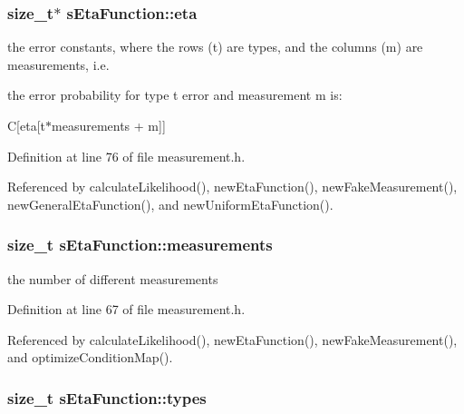 \hypertarget{structsEtaFunction_a7585a59b1861523157055f8c8b0263e3}{
\subsubsection[{eta}]{\setlength{\rightskip}{0pt plus 5cm}size\-\_\-t$\ast$ {\bf s\-Eta\-Function\-::eta}}}\label{structsEtaFunction_a7585a59b1861523157055f8c8b0263e3}


the error constants, where the rows (t) are types, and the columns (m) are measurements, i.\-e. 

the error probability for type t error and measurement m is\-:

\-C\mbox{[}eta\mbox{[}t$\ast$measurements + m\mbox{]}\mbox{]} 

\-Definition at line 76 of file measurement.\-h.



\-Referenced by calculate\-Likelihood(), new\-Eta\-Function(), new\-Fake\-Measurement(), new\-General\-Eta\-Function(), and new\-Uniform\-Eta\-Function().

\hypertarget{structsEtaFunction_aa323ef11935cd1e8d6ef56405ab96cf8}{
\subsubsection[{measurements}]{\setlength{\rightskip}{0pt plus 5cm}size\-\_\-t {\bf s\-Eta\-Function\-::measurements}}}\label{structsEtaFunction_aa323ef11935cd1e8d6ef56405ab96cf8}


the number of different measurements 



\-Definition at line 67 of file measurement.\-h.



\-Referenced by calculate\-Likelihood(), new\-Eta\-Function(), new\-Fake\-Measurement(), and optimize\-Condition\-Map().

\hypertarget{structsEtaFunction_afd94a9856047e0987c5e8667a4838b71}{
\subsubsection[{types}]{\setlength{\rightskip}{0pt plus 5cm}size\-\_\-t {\bf s\-Eta\-Function\-::types}}}\label{structsEtaFunction_afd94a9856047e0987c5e8667a4838b71}


